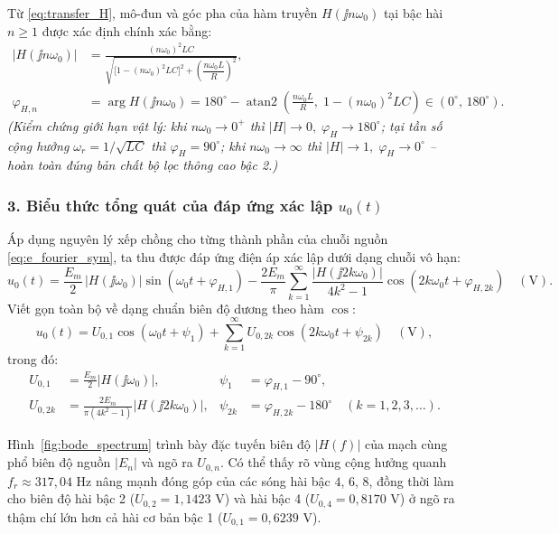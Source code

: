 Từ \eqref{eq:transfer_H}, mô-đun và góc pha của hàm truyền $H(\jj n\omega_0)$ tại bậc hài $n \ge 1$ được xác định chính xác bằng:
\begin{align}
    |H(\jj n\omega_0)| &= \frac{(n\omega_0)^2 LC}{\sqrt{\Big[1 - (n\omega_0)^2 LC\Big]^2 + \left(\dfrac{n\omega_0 L}{R}\right)^2}}, \label{eq:H_mag}\\
    \varphi_{H,n} &= \arg H(\jj n\omega_0) = 180^\circ - \operatorname{atan2}\!\left(\frac{n\omega_0 L}{R},\; 1 - (n\omega_0)^2 LC\right) \in (0^\circ,\, 180^\circ). \label{eq:H_phase}
\end{align}
\textit{(Kiểm chứng giới hạn vật lý: khi $n\omega_0 \to 0^+$ thì $|H| \to 0,\; \varphi_H \to 180^\circ$; tại tần số cộng hưởng $\omega_r = 1/\sqrt{LC}$ thì $\varphi_H = 90^\circ$; khi $n\omega_0 \to \infty$ thì $|H| \to 1,\; \varphi_H \to 0^\circ$ -- hoàn toàn đúng bản chất bộ lọc thông cao bậc 2.)}

\subsubsection*{3. Biểu thức tổng quát của đáp ứng xác lập $u_0(t)$}
Áp dụng nguyên lý xếp chồng cho từng thành phần của chuỗi nguồn \eqref{eq:e_fourier_sym}, ta thu được đáp ứng điện áp xác lập dưới dạng chuỗi vô hạn:
\begin{equation}
    u_0(t) = \frac{E_m}{2}\,|H(\jj\omega_0)|\sin(\omega_0 t + \varphi_{H,1})
           - \frac{2E_m}{\pi}\sum_{k=1}^{\infty} \frac{|H(\jj 2k\omega_0)|}{4k^2 - 1}\cos(2k\omega_0 t + \varphi_{H,2k})
           \quad (\text{V}).
    \label{eq:u0_inf}
\end{equation}
Viết gọn toàn bộ về dạng chuẩn biên độ dương theo hàm $\cos$:
\begin{equation}
    u_0(t) = U_{0,1}\cos(\omega_0 t + \psi_1) + \sum_{k=1}^{\infty} U_{0,2k}\cos(2k\omega_0 t + \psi_{2k}) \quad (\text{V}),
    \label{eq:u0_inf_cos}
\end{equation}
trong đó:
\begin{align}
    U_{0,1} &= \frac{E_m}{2}|H(\jj\omega_0)|, & \psi_1 &= \varphi_{H,1} - 90^\circ, \\
    U_{0,2k} &= \frac{2E_m}{\pi(4k^2 - 1)}|H(\jj 2k\omega_0)|, & \psi_{2k} &= \varphi_{H,2k} - 180^\circ \quad (k = 1, 2, 3, \dots).
\end{align}

Hình~\ref{fig:bode_spectrum} trình bày đặc tuyến biên độ $|H(f)|$ của mạch cùng phổ biên độ nguồn $|E_n|$ và ngõ ra $U_{0,n}$. Có thể thấy rõ vùng cộng hưởng quanh $f_r \approx 317{,}04\text{ Hz}$ nâng mạnh đóng góp của các sóng hài bậc $4$, $6$, $8$, đồng thời làm cho biên độ hài bậc 2 ($U_{0,2} = 1{,}1423\text{ V}$) và hài bậc 4 ($U_{0,4} = 0{,}8170\text{ V}$) ở ngõ ra thậm chí lớn hơn cả hài cơ bản bậc 1 ($U_{0,1} = 0{,}6239\text{ V}$).

